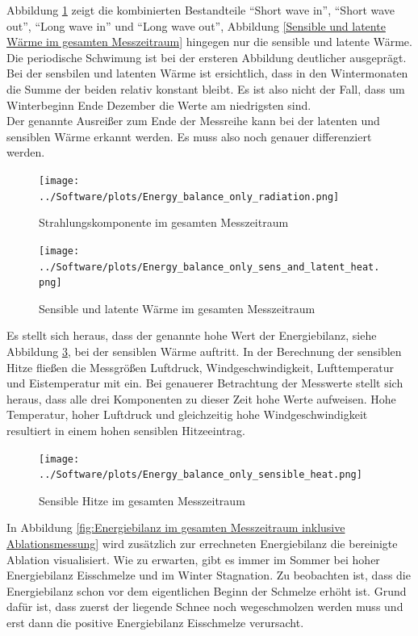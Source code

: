 \documentclass[12pt,a4paper]{article}
\begin{document}
Abbildung \ref{fig:Strahlungskomponente im gesamten Messzeitraum} zeigt die kombinierten Bestandteile ``Short wave in'', ``Short wave out'', ``Long wave in'' und ``Long wave out'', Abbildung \ref{Sensible und latente Wärme im gesamten Messzeitraum} hingegen nur die sensible und latente Wärme. Die periodische Schwimung ist bei der ersteren Abbildung deutlicher ausgeprägt. Bei der sensbilen und latenten Wärme ist ersichtlich, dass in den Wintermonaten die Summe der beiden relativ konstant bleibt. Es ist also nicht der Fall, dass um Winterbeginn Ende Dezember die Werte am niedrigsten sind.\\
Der genannte Ausreißer zum Ende der Messreihe kann bei der latenten und sensiblen Wärme erkannt werden. Es muss also noch genauer differenziert werden.

\begin{figure}[H]
\centering
\texttt{[image: ../Software/plots/Energy\_balance\_only\_radiation.png]}
\caption{Strahlungskomponente im gesamten Messzeitraum}
\label{fig:Strahlungskomponente im gesamten Messzeitraum}
\end{figure}



\begin{figure}[H]
\centering
\texttt{[image: ../Software/plots/Energy\_balance\_only\_sens\_and\_latent\_heat.png]}
\caption{Sensible und latente Wärme im gesamten Messzeitraum}
\label{fig:Sensible und latente Wärme im gesamten Messzeitraum}
\end{figure}

Es stellt sich heraus, dass der genannte hohe Wert der Energiebilanz, siehe Abbildung \ref{fig:Sensible Hitze im gesamten Messzeitraum}, bei der sensiblen Wärme auftritt. In der Berechnung der sensiblen Hitze fließen die Messgrößen Luftdruck, Windgeschwindigkeit, Lufttemperatur und Eistemperatur mit ein. Bei genauerer Betrachtung der Messwerte stellt sich heraus, dass alle drei Komponenten zu dieser Zeit hohe Werte aufweisen. Hohe Temperatur, hoher Luftdruck und gleichzeitig hohe Windgeschwindigkeit resultiert in einem hohen sensiblen Hitzeeintrag. 


\begin{figure}[H]
\centering
\texttt{[image: ../Software/plots/Energy\_balance\_only\_sensible\_heat.png]}
\caption{Sensible Hitze im gesamten Messzeitraum}
\label{fig:Sensible Hitze im gesamten Messzeitraum}
\end{figure}

In Abbildung \ref{fig:Energiebilanz im gesamten Messzeitraum inklusive Ablationsmessung} wird zusätzlich zur errechneten Energiebilanz die bereinigte Ablation visualisiert. Wie zu erwarten, gibt es immer im Sommer bei hoher Energiebilanz Eisschmelze und im Winter Stagnation. Zu beobachten ist, dass die Energiebilanz schon vor dem eigentlichen Beginn der Schmelze erhöht ist. Grund dafür ist, dass zuerst der liegende Schnee noch wegeschmolzen werden muss und erst dann die positive Energiebilanz Eisschmelze verursacht.
\end{document}
